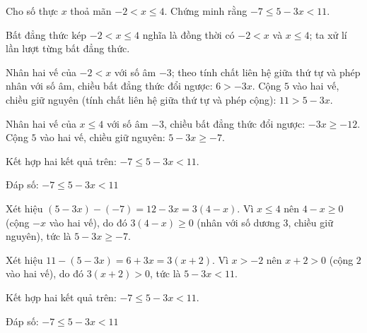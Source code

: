 \begin{problem}[9DS-BPT-025]
Cho số thực $x$ thoả mãn $-2 < x \leq 4$. Chứng minh rằng $-7 \leq 5 - 3x < 11$.

\begin{solution}
Bất đẳng thức kép $-2 < x \leq 4$ nghĩa là đồng thời có $-2 < x$ và $x \leq 4$; ta xử lí lần lượt từng bất đẳng thức.

Nhân hai vế của $-2 < x$ với số âm $-3$; theo tính chất liên hệ giữa thứ tự và phép nhân với số âm, chiều bất đẳng thức đổi ngược: $6 > -3x$. Cộng $5$ vào hai vế, chiều giữ nguyên (tính chất liên hệ giữa thứ tự và phép cộng): $11 > 5 - 3x$.

Nhân hai vế của $x \leq 4$ với số âm $-3$, chiều bất đẳng thức đổi ngược: $-3x \geq -12$. Cộng $5$ vào hai vế, chiều giữ nguyên: $5 - 3x \geq -7$.

Kết hợp hai kết quả trên: $-7 \leq 5 - 3x < 11$.

Đáp số: $\boxed{-7 \leq 5 - 3x < 11}$
\end{solution}

\begin{solution}
Xét hiệu $(5 - 3x) - (-7) = 12 - 3x = 3(4 - x)$. Vì $x \leq 4$ nên $4 - x \geq 0$ (cộng $-x$ vào hai vế), do đó $3(4 - x) \geq 0$ (nhân với số dương $3$, chiều giữ nguyên), tức là $5 - 3x \geq -7$.

Xét hiệu $11 - (5 - 3x) = 6 + 3x = 3(x + 2)$. Vì $x > -2$ nên $x + 2 > 0$ (cộng $2$ vào hai vế), do đó $3(x + 2) > 0$, tức là $5 - 3x < 11$.

Kết hợp hai kết quả trên: $-7 \leq 5 - 3x < 11$.

Đáp số: $\boxed{-7 \leq 5 - 3x < 11}$
\end{solution}
\end{problem}


